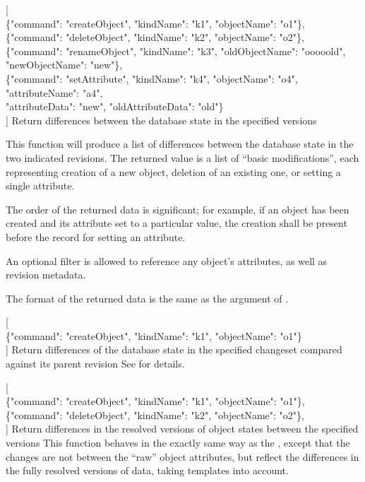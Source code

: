 \documentclass{article}
\begin{document}
    {[ \\
    \{"command": "createObject", "kindName": "k1", "objectName": "o1"\}, \\
    \{"command": "deleteObject", "kindName": "k2", "objectName": "o2"\}, \\
    \{"command": "renameObject", "kindName": "k3", "oldObjectName": "ooooold", "newObjectName": "new"\}, \\
    \{"command": "setAttribute", "kindName": "k4", "objectName": "o4", "attributeName": "a4", \\
        "attributeData": "new", "oldAttributeData": "old"\} \\
    ]}
    {Return differences between the database state in the specified versions}
    {This function will produce a list of differences between the database state in the two indicated revisions.  The
    returned value is a list of ``basic modifications'', each representing creation of a new object, deletion of an
    existing one, or setting a single attribute.

    The order of the returned data is significant; for example, if an object has been created and its attribute set to a
    particular value, the creation shall be present before the record for setting an attribute.

    An optional filter is allowed to reference any object's attributes, as well as revision metadata.

    The format of the returned data is the same as the argument of .}

    {[ \\
    \{"command": "createObject", "kindName": "k1", "objectName": "o1"\} \\
    ]}
    {Return differences of the database state in the specified changeset compared against its parent revision}
    {See  for details.}

    {[ \\
    \{"command": "createObject", "kindName": "k1", "objectName": "o1"\}, \\
    \{"command": "deleteObject", "kindName": "k2", "objectName": "o2"\}, \\
    ]}
    {Return differences in the resolved versions of object states between the specified versions}
    {This function behaves in the exactly same way as the , except that the changes are not
    between the ``raw'' object attributes, but reflect the differences in the fully resolved versions of data, taking
    templates  into account.}
\end{document}
